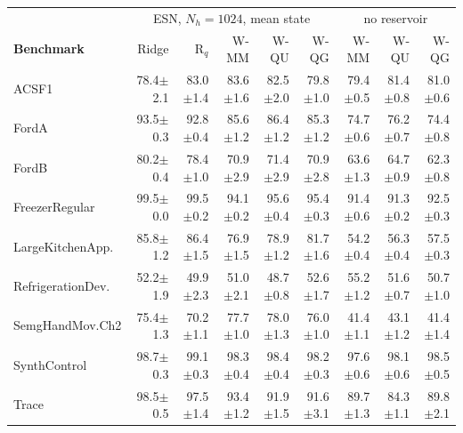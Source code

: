 \begin{table}[t]
\centering
\scriptsize
\setlength{\tabcolsep}{2pt}
\renewcommand{\arraystretch}{0.92}
\begin{tabular}{l|rrrrr|rrr}
 & \multicolumn{5}{c|}{ESN, $N_h = 1024$, mean state} & \multicolumn{3}{c}{no reservoir}\\
\textbf{Benchmark} & Ridge & R$_{q}$ & W-MM & W-QU & W-QG & W-MM & W-QU & W-QG\\
\hline
ACSF1 & 78.4{\tiny$\pm$2.1} & 83.0{\tiny$\pm$1.4} & 83.6{\tiny$\pm$1.6} & 82.5{\tiny$\pm$2.0} & 79.8{\tiny$\pm$1.0} & 79.4{\tiny$\pm$0.5} & 81.4{\tiny$\pm$0.8} & 81.0{\tiny$\pm$0.6}\\
FordA & 93.5{\tiny$\pm$0.3} & 92.8{\tiny$\pm$0.4} & 85.6{\tiny$\pm$1.2} & 86.4{\tiny$\pm$1.2} & 85.3{\tiny$\pm$1.2} & 74.7{\tiny$\pm$0.6} & 76.2{\tiny$\pm$0.7} & 74.4{\tiny$\pm$0.8}\\
FordB & 80.2{\tiny$\pm$0.4} & 78.4{\tiny$\pm$1.0} & 70.9{\tiny$\pm$2.9} & 71.4{\tiny$\pm$2.9} & 70.9{\tiny$\pm$2.8} & 63.6{\tiny$\pm$1.3} & 64.7{\tiny$\pm$0.9} & 62.3{\tiny$\pm$0.8}\\
FreezerRegular & 99.5{\tiny$\pm$0.0} & 99.5{\tiny$\pm$0.2} & 94.1{\tiny$\pm$0.2} & 95.6{\tiny$\pm$0.4} & 95.4{\tiny$\pm$0.3} & 91.4{\tiny$\pm$0.6} & 91.3{\tiny$\pm$0.2} & 92.5{\tiny$\pm$0.3}\\
LargeKitchenApp. & 85.8{\tiny$\pm$1.2} & 86.4{\tiny$\pm$1.5} & 76.9{\tiny$\pm$1.5} & 78.9{\tiny$\pm$1.2} & 81.7{\tiny$\pm$1.6} & 54.2{\tiny$\pm$0.4} & 56.3{\tiny$\pm$0.4} & 57.5{\tiny$\pm$0.3}\\
RefrigerationDev. & 52.2{\tiny$\pm$1.9} & 49.9{\tiny$\pm$2.3} & 51.0{\tiny$\pm$2.1} & 48.7{\tiny$\pm$0.8} & 52.6{\tiny$\pm$1.7} & 55.2{\tiny$\pm$1.2} & 51.6{\tiny$\pm$0.7} & 50.7{\tiny$\pm$1.0}\\
SemgHandMov.Ch2 & 75.4{\tiny$\pm$1.3} & 70.2{\tiny$\pm$1.1} & 77.7{\tiny$\pm$1.0} & 78.0{\tiny$\pm$1.3} & 76.0{\tiny$\pm$1.0} & 41.4{\tiny$\pm$1.1} & 43.1{\tiny$\pm$1.2} & 41.4{\tiny$\pm$1.4}\\
SynthControl & 98.7{\tiny$\pm$0.3} & 99.1{\tiny$\pm$0.3} & 98.3{\tiny$\pm$0.4} & 98.4{\tiny$\pm$0.4} & 98.2{\tiny$\pm$0.3} & 97.6{\tiny$\pm$0.6} & 98.1{\tiny$\pm$0.6} & 98.5{\tiny$\pm$0.5}\\
Trace & 98.5{\tiny$\pm$0.5} & 97.5{\tiny$\pm$1.4} & 93.4{\tiny$\pm$1.2} & 91.9{\tiny$\pm$1.5} & 91.6{\tiny$\pm$3.1} & 89.7{\tiny$\pm$1.3} & 84.3{\tiny$\pm$1.1} & 89.8{\tiny$\pm$2.1}\\

\end{tabular}
\end{table}
